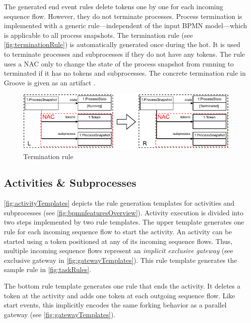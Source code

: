 \documentclass[runningheads]{llncs}
\begin{document}
The generated end event rules delete tokens one by one for each incoming sequence flow.
However, they do not terminate processes.
Process termination is implemented with a generic rule---independent of the input BPMN model---which is applicable to all process snapshots.
The termination rule (see \autoref{fig:terminationRule}) is automatically generated once during the \gls*{hot}.
It is used to terminate processes and subprocesses if they do not have any tokens.
The rule uses a NAC only to change the state of the process snapshot from running to terminated if it has no tokens and subprocesses.
The concrete termination rule in Groove is given as an artifact \cite{krauterArtifactsICGT2023}.

\begin{figure}[ht]
    \centering
    \includegraphics[width=.8\textwidth]{images/bpmn_semantics-termination_rule.pdf}
    \caption{Termination rule}
    \label{fig:terminationRule}
\end{figure}

\subsection{Activities \& Subprocesses}

\autoref{fig:activityTemplates} depicts the rule generation templates for activities and subprocesses (see \autoref{fig:bpmnfeaturesOverview}).
Activity execution is divided into two steps implemented by two rule templates.
The upper template generates one rule for each incoming sequence flow to start the activity.
An activity can be started using a token positioned at any of its incoming sequence flows.
Thus, multiple incoming sequence flows represent an \textit{implicit exclusive gateway} (see exclusive gateway in \autoref{fig:gatewayTemplates}).
This rule template generates the sample rule in \autoref{fig:taskRules}.

The bottom rule template generates one rule that ends the activity.
It deletes a token at the activity and adds one token at each outgoing sequence flow.
Like start events, this implicitly encodes the same forking behavior as a parallel gateway (see \autoref{fig:gatewayTemplates}). 
\end{document}

